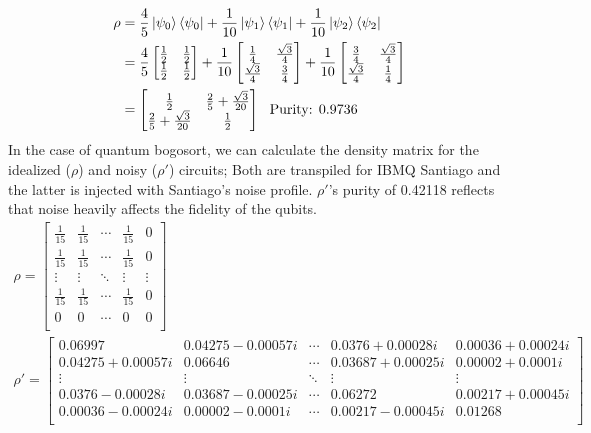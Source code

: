 \documentclass[12pt]{article}
\begin{document}
\begin{align*}
    \rho &= \frac{4}{5} \ket{\psi_0}\bra{\psi_0} + \frac{1}{10} \ket{\psi_1}\bra{\psi_1} + \frac{1}{10} \ket{\psi_2}\bra{\psi_2} \\
    &= \frac{4}{5} \begin{bmatrix} \frac{1}{2} & \frac{1}{2} \\ \frac{1}{2} & \frac{1}{2} \end{bmatrix} + \frac{1}{10} \begin{bmatrix} \frac{1}{4} & \frac{\sqrt{3}}{4} \\ \frac{\sqrt{3}}{4} & \frac{3}{4} \\ \end{bmatrix} + \frac{1}{10} \begin{bmatrix} \frac{3}{4} & \frac{\sqrt{3}}{4} \\ \frac{\sqrt{3}}{4} & \frac{1}{4} \\ \end{bmatrix} \\
    &= \begin{bmatrix} \frac{1}{2} & \frac{2}{5} + \frac{\sqrt{3}}{20} \\ \frac{2}{5} + \frac{\sqrt{3}}{20} & \frac{1}{2} \\ \end{bmatrix} \ \ \text{Purity: 0.9736}
\end{align*}
In the case of quantum bogosort, we can calculate the density matrix for the idealized ($\rho$) and noisy ($\rho'$) circuits; Both are transpiled for IBMQ Santiago and the latter is injected with Santiago's noise profile. $\rho'$'s purity of 0.42118 reflects that noise heavily affects the fidelity of the qubits.
\begin{gather*}
    \rho = \begin{bmatrix}
        \frac{1}{15} & \frac{1}{15} & \cdots & \frac{1}{15} & 0 \\
        \frac{1}{15} & \frac{1}{15} & \cdots & \frac{1}{15} & 0 \\
        \vdots & \vdots & \ddots & \vdots & \vdots \\
        \frac{1}{15} & \frac{1}{15} & \cdots & \frac{1}{15} & 0 \\
        0 & 0 & \cdots & 0 & 0 \\
    \end{bmatrix} \\
    \rho' = \begin{bmatrix}
        0.06997 & 0.04275 - 0.00057i & \cdots & 0.0376 + 0.00028i & 0.00036 + 0.00024i  \\
        0.04275 + 0.00057i & 0.06646 & \cdots & 0.03687 + 0.00025i & 0.00002 + 0.0001i  \\
        \vdots & \vdots & \ddots & \vdots & \vdots \\
        0.0376 - 0.00028i & 0.03687 - 0.00025i & \cdots & 0.06272 & 0.00217 + 0.00045i  \\
        0.00036 - 0.00024i & 0.00002 - 0.0001i & \cdots & 0.00217 - 0.00045i & 0.01268  \\
    \end{bmatrix}
\end{gather*}
\end{document}
